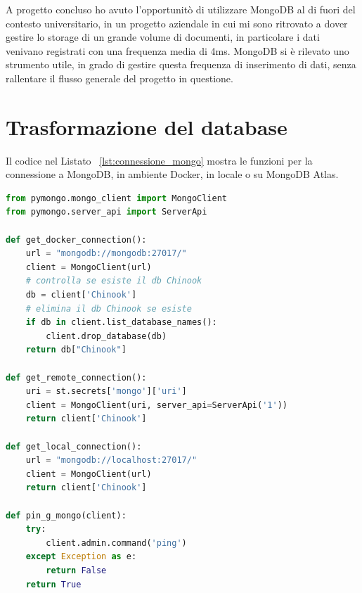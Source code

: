 \documentclass{article}
\begin{document}
A progetto concluso ho avuto l'opportunitò di utilizzare MongoDB al di fuori del contesto universitario, in un progetto aziendale in cui 
mi sono ritrovato a dover gestire lo storage di un grande volume di documenti, in particolare i dati venivano registrati con una frequenza media
di 4ms. MongoDB si è rilevato uno strumento utile, in grado di gestire questa frequenza di inserimento di dati, senza rallentare il flusso generale
del progetto in questione.





\newpage
{}



\newpage
\appendix

\section{Trasformazione del database}

\label{sec:Trasformazione}

Il codice nel Listato ~\ref{lst:connessione_mongo} mostra le funzioni per la connessione a MongoDB, in ambiente Docker, in locale o su MongoDB Atlas.

\begin{lstlisting}[language=Python, caption={Connessione a MongoDB}, label={lst:connessione_mongo}]
from pymongo.mongo_client import MongoClient
from pymongo.server_api import ServerApi

def get_docker_connection():
    url = "mongodb://mongodb:27017/"
    client = MongoClient(url)
    # controlla se esiste il db Chinook
    db = client['Chinook']
    # elimina il db Chinook se esiste
    if db in client.list_database_names():
        client.drop_database(db)
    return db["Chinook"]

def get_remote_connection():
    uri = st.secrets['mongo']['uri']
    client = MongoClient(uri, server_api=ServerApi('1'))
    return client['Chinook']

def get_local_connection():
    url = "mongodb://localhost:27017/"
    client = MongoClient(url)
    return client['Chinook']

def pin_g_mongo(client):
    try:
        client.admin.command('ping')
    except Exception as e:
        return False
    return True
\end{lstlisting}
\end{document}
